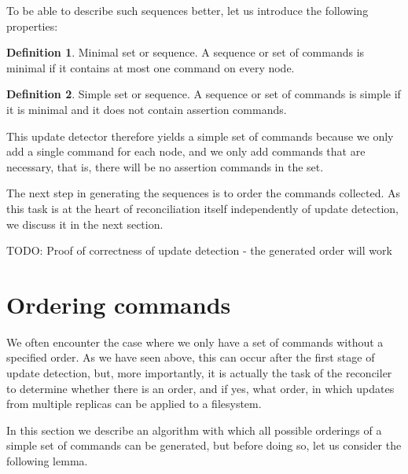 \documentclass[12pt]{article}
\theoremstyle{definition}
\newtheorem{mydef}{Definition}
\begin{document}
To be able to describe such sequences better, let us introduce the following properties:

\begin{mydef}{Minimal set or sequence.}
A sequence or set of commands is minimal if it contains at most one command on every node.
\end{mydef}

\begin{mydef}{Simple set or sequence.}
A sequence or set of commands is simple if it is minimal and it does not contain assertion commands.
\end{mydef}

This update detector therefore yields a simple set of commands because we only add a single command
for each node, and we only add commands that are necessary, that is, there will be no 
assertion commands in the set.

The next step in generating the sequences is to order the commands collected.
As this task is at the heart of reconciliation itself independently of update detection,
we discuss it in the next section.

TODO: Proof of correctness of update detection - the generated order will work


\section{Ordering commands}\label{ordering}

We often encounter the case where we only have a set of commands without a specified order.
As we have seen above, this can occur after the first stage of update detection,
but, more importantly,
it is actually the task of the reconciler to determine whether there is an order,
and if yes, what order,
in which updates from multiple replicas can be applied to a filesystem.

In this section we describe an algorithm with which all possible orderings of a
simple set of commands can be generated, but before doing so, let us consider the following lemma.
\end{document}
